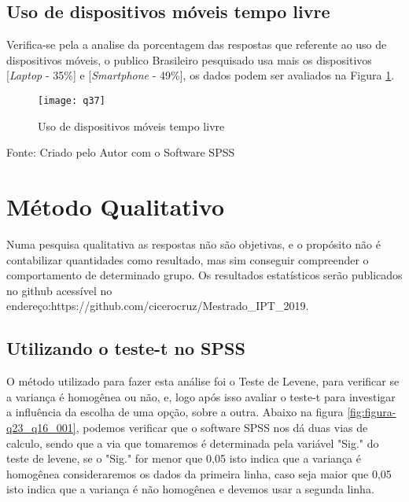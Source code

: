 \subsection{Uso de dispositivos móveis tempo livre}

Verifica-se pela a analise da porcentagem das respostas que referente ao uso de dispositivos móveis, o publico Brasileiro pesquisado usa mais os dispositivos [\textit{Laptop} - 35\%] e [\textit{Smartphone} - 49\%], os dados podem ser avaliados na Figura \ref{fig:figura-q37}.

\begin{figure}[H]
	\centering	
	\caption{Uso de dispositivos móveis tempo livre}
	\texttt{[image: q37]}
	\label{fig:figura-q37}
\end{figure}
\vspace{-0.8 cm} \hspace{3.15 cm} Fonte: Criado pelo Autor com o Software SPSS\newline

\section{Método Qualitativo}

Numa pesquisa qualitativa as respostas não são objetivas, e o propósito não é contabilizar quantidades como resultado, mas sim conseguir compreender o comportamento de determinado grupo. Os resultados estatísticos serão publicados no github acessível no endereço:https://github.com/cicerocruz/Mestrado\_IPT\_2019.

\subsection{Utilizando o teste-t no SPSS}

O método utilizado para fazer esta análise foi o Teste de Levene, para verificar se  a variança é homogênea ou não, e, logo após isso avaliar o teste-t para investigar a influência da escolha de uma opção, sobre a outra.\newline
\indent Abaixo na figura \ref{fig:figura-q23_q16_001}, podemos verificar que o software SPSS nos dá duas vias de calculo, sendo que a via  que  tomaremos é  determinada pela variável "Sig." do teste de levene, se o "Sig." for menor que 0,05 isto indica que a variança é homogênea consideraremos os dados da primeira linha, caso seja maior que 0,05 isto indica que a variança é não homogênea e devemos usar a segunda linha.\newline

